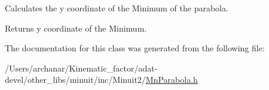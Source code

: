 Calculates the y coordinate of the Minimum of the parabola.

\begin{DoxyReturn}{Returns}
y coordinate of the Minimum. 
\end{DoxyReturn}


The documentation for this class was generated from the following file\+:\begin{DoxyCompactItemize}
\item 
/\+Users/archanar/\+Kinematic\+\_\+factor/adat-\/devel/other\+\_\+libs/minuit/inc/\+Minuit2/\mbox{\hyperlink{adat-devel_2other__libs_2minuit_2inc_2Minuit2_2MnParabola_8h}{Mn\+Parabola.\+h}}\end{DoxyCompactItemize}
